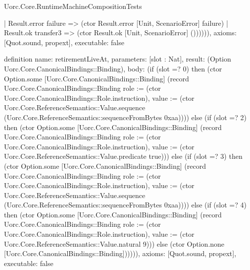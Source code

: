 \begin{lexlean}{Uorc.Core.RuntimeMachineCompositionTests}
\begin{semanticmodule}
{          | Result.error failure => (ctor Result.error [Unit, ScenarioError] failure)
          | Result.ok transfer3 => (ctor Result.ok [Unit, ScenarioError] ()))))),
  axioms: [Quot.sound, propext],
  executable: false
}

definition{
  name: retirementLiveAt,
  parameters: [slot : Nat],
  result: (Option Uorc.Core.CanonicalBindings::Binding),
  body: (if (slot =? 0) then (ctor Option.some [Uorc.Core.CanonicalBindings::Binding] (record Uorc.Core.CanonicalBindings::Binding {role := (ctor Uorc.Core.CanonicalBindings::Role.instruction), value := (ctor Uorc.Core.ReferenceSemantics::Value.sequence (Uorc.Core.ReferenceSemantics::sequenceFromBytes 0xaa))})) else (if (slot =? 2) then (ctor Option.some [Uorc.Core.CanonicalBindings::Binding] (record Uorc.Core.CanonicalBindings::Binding {role := (ctor Uorc.Core.CanonicalBindings::Role.instruction), value := (ctor Uorc.Core.ReferenceSemantics::Value.predicate true)})) else (if (slot =? 3) then (ctor Option.some [Uorc.Core.CanonicalBindings::Binding] (record Uorc.Core.CanonicalBindings::Binding {role := (ctor Uorc.Core.CanonicalBindings::Role.instruction), value := (ctor Uorc.Core.ReferenceSemantics::Value.sequence (Uorc.Core.ReferenceSemantics::sequenceFromBytes 0xaa))})) else (if (slot =? 4) then (ctor Option.some [Uorc.Core.CanonicalBindings::Binding] (record Uorc.Core.CanonicalBindings::Binding {role := (ctor Uorc.Core.CanonicalBindings::Role.instruction), value := (ctor Uorc.Core.ReferenceSemantics::Value.natural 9)})) else (ctor Option.none [Uorc.Core.CanonicalBindings::Binding]))))),
  axioms: [Quot.sound, propext],
  executable: false
}


\end{semanticmodule}
\end{lexlean}

